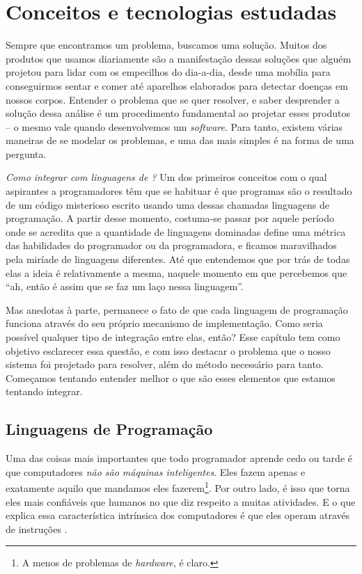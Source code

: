 
\chapter{Conceitos e tecnologias estudadas}
\label{cap:conceitos}
  Sempre que encontramos um problema, buscamos uma solução. Muitos dos produtos
  que usamos diariamente são a manifestação dessas soluções que alguém projetou
  para lidar com os empecilhos do dia-a-dia, desde uma mobília para conseguirmos
  sentar e comer até aparelhos elaborados para detectar doenças em nossos
  corpos. Entender o problema que se quer resolver, e saber desprender a solução
  dessa análise é um procedimento fundamental ao projetar esses produtos -- o
  mesmo vale quando desenvolvemos um \textit{software}. Para tanto, existem
  várias maneiras de se modelar os problemas, e uma das mais simples é na forma
  de uma pergunta.

  \emph{Como integrar \CXX{} com linguagens de \script{}?} Um dos primeiros
  conceitos com o qual aspirantes a programadores têm que se habituar é que
  programas são o resultado de um código misterioso escrito usando uma dessas
  chamadas linguagens de programação. A partir desse momento, costuma-se passar
  por aquele período onde se acredita que a quantidade de linguagens dominadas
  define uma métrica das habilidades do programador ou da programadora, e
  ficamos maravilhados pela miríade de linguagens diferentes. Até que entendemos
  que por trás de todas elas a ideia é relativamente a mesma, naquele momento em
  que percebemos que ``ah, então é assim que se faz um laço nessa linguagem''.
  
  Mas anedotas à parte, permanece o fato de que cada linguagem de programação
  funciona através do seu próprio mecanismo de implementação. Como seria
  possível qualquer tipo de integração entre elas, então? Esse capítulo tem
  como objetivo esclarecer essa questão, e com isso destacar o problema que
  o nosso sistema foi projetado para resolver, além do método necessário para
  tanto. Começamos tentando entender melhor o que são esses elementos que
  estamos tentando integrar.

  \section{Linguagens de Programação}
  \label{cap:conceitos:linguagens}
    Uma das coisas mais importantes que todo programador aprende cedo ou tarde é
    que computadores \emph{não são máquinas inteligentes}. Eles fazem apenas e
    exatamente aquilo que mandamos eles fazerem\footnote{A menos de problemas de
    \textit{hardware}, é claro.}. Por outro lado, é isso que torna eles mais
    confiáveis que humanos no que diz respeito a muitas atividades. E o que
    explica essa característica intrínsica dos computadores é que eles operam
    através de instruções \cite{cpp:00}.


